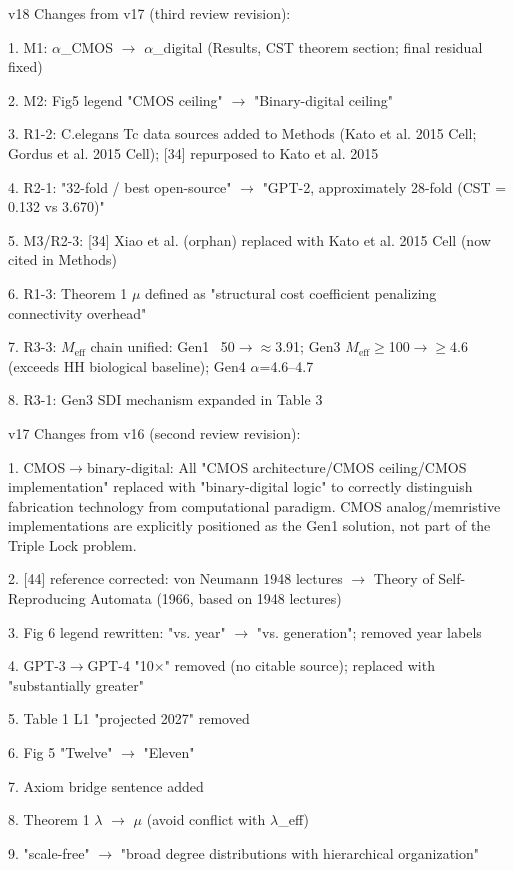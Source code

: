\documentclass[a4paper,12pt]{article}
\begin{document}
v18 Changes from v17 (third review revision):

1. M1: $\alpha$_CMOS $\rightarrow$ $\alpha$_digital (Results, CST theorem section; final residual fixed)

2. M2: Fig5 legend "CMOS ceiling" $\rightarrow$ "Binary-digital ceiling"

3. R1-2: C.elegans Tc data sources added to Methods (Kato et al. 2015 Cell; Gordus et al. 2015 Cell); [34] repurposed to Kato et al. 2015

4. R2-1: "32-fold / best open-source" $\rightarrow$ "GPT-2, approximately 28-fold (CST = 0.132 vs 3.670)"

5. M3/R2-3: [34] Xiao et al. (orphan) replaced with Kato et al. 2015 Cell (now cited in Methods)

6. R1-3: Theorem 1 $\mu$ defined as "structural cost coefficient penalizing connectivity overhead"

7. R3-3: $M_{\text{eff}}$ chain unified: Gen1 ~50$\rightarrow$\alpha$\approx$3.91; Gen3 $M_{\text{eff}}$$\geq$100$\rightarrow$\alpha$\geq$4.6 (exceeds HH biological baseline); Gen4 $\alpha$=4.6--4.7

8. R3-1: Gen3 SDI mechanism expanded in Table 3

v17 Changes from v16 (second review revision):

1. CMOS$\rightarrow$binary-digital: All "CMOS architecture/CMOS ceiling/CMOS implementation" replaced with "binary-digital logic" to correctly distinguish fabrication technology from computational paradigm. CMOS analog/memristive implementations are explicitly positioned as the Gen1 solution, not part of the Triple Lock problem.

2. [44] reference corrected: von Neumann 1948 lectures $\rightarrow$ Theory of Self-Reproducing Automata (1966, based on 1948 lectures)

3. Fig 6 legend rewritten: "vs. year" $\rightarrow$ "vs. generation"; removed year labels

4. GPT-3$\rightarrow$GPT-4 "10$\times$" removed (no citable source); replaced with "substantially greater"

5. Table 1 L1 "projected 2027" removed

6. Fig 5 "Twelve" $\rightarrow$ "Eleven"

7. Axiom bridge sentence added

8. Theorem 1 $\lambda$ $\rightarrow$ $\mu$ (avoid conflict with $\lambda$\_eff)

9. "scale-free" $\rightarrow$ "broad degree distributions with hierarchical organization"
\end{document}
